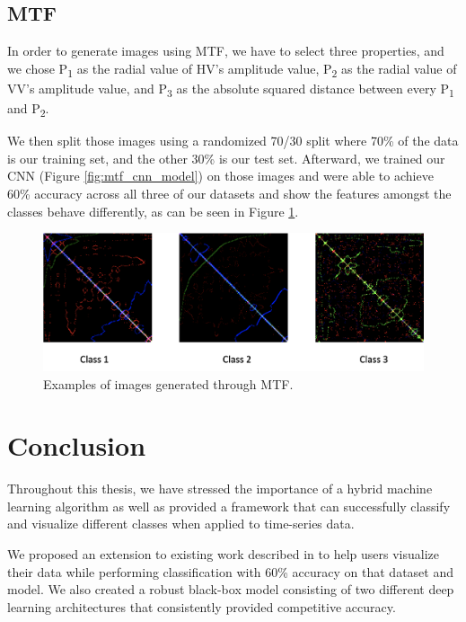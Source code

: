 \documentclass{turabian-thesis}
\begin{document}
\section{ MTF }
 
In order to generate images using MTF, we have to select three properties, and we chose P\textsubscript{1} as the radial value of HV's amplitude value, P\textsubscript{2} as the radial value of VV's amplitude value, and P\textsubscript{3} as the absolute squared distance between every P\textsubscript{1} and P\textsubscript{2}. 

We then split those images using a randomized 70/30 split where 70\% of the data is our training set, and the other 30\% is our test set. Afterward, we trained our CNN (Figure \ref{fig:mtf_cnn_model}) on those images and were able to achieve 60\% accuracy across all three of our datasets and show the features amongst the classes behave differently, as can be seen in Figure \ref{fig:whitebox_images}.

\begin{figure}[h!]
   \begin{center}
      \includegraphics[scale=0.5]{../media/whitebox_images.png}
   \end{center}
   \caption{Examples of images generated through MTF.}
   \label{fig:whitebox_images}
\end{figure}


\chapter{Conclusion}
\label{chap:conclusion}
Throughout this thesis, we have stressed the importance of a hybrid machine learning algorithm as well as provided a framework that can successfully classify and visualize different classes when applied to time-series data. 

We proposed an extension to existing work described in \cite{wang_encoding_nodate} to help users visualize their data while performing classification  with 60\% accuracy on that dataset and model. We also created a robust black-box model consisting of two different deep learning architectures that consistently provided competitive accuracy.
\end{document}

